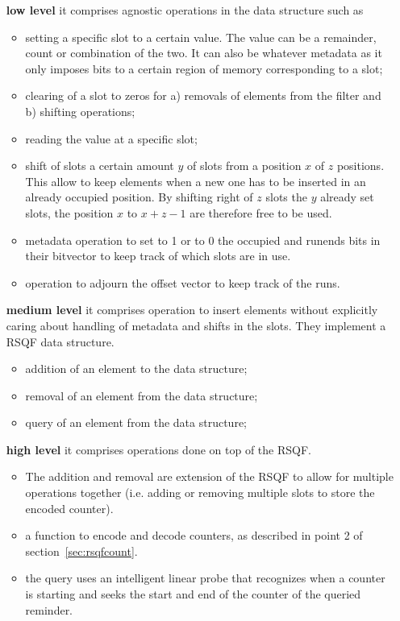 \begin{itemize}
	\item[\textbf{low level}] it comprises agnostic operations in the data structure such as
	\begin{itemize}
		\item setting a specific slot to a certain value. The value can be a remainder, count or combination of the two. It can also be whatever metadata as it only imposes bits to a certain region of memory corresponding to a slot;
		\item clearing of a slot to zeros for a) removals of elements from the filter and b) shifting operations;
		\item reading the value at a specific slot;
		\item shift of slots a certain amount $y$ of slots from a position $x$ of $z$ positions. This allow to keep elements when a new one has to be inserted in an already occupied position. By shifting right of $z$ slots the $y$ already set slots, the position $x$ to $x+z-1$ are therefore free to be used.
		\item metadata operation to set to 1 or to 0 the occupied and runends bits in their bitvector to keep track of which slots are in use.
		\item operation to adjourn the offset vector to keep track of the runs.
	\end{itemize}
	\item[\textbf{medium level}] it comprises operation to insert elements without explicitly caring about handling of metadata and shifts in the slots. They implement a RSQF data structure.
	\begin{itemize}
		\item addition of an element to the data structure;
		\item removal of an element from the data structure;
		\item query of an element from the data structure;
	\end{itemize}
	\item[\textbf{high level}] it comprises operations done on top of the RSQF. 
	\begin{itemize}
		\item The addition and removal are extension of the RSQF to allow for multiple operations together (i.e. adding or removing multiple slots to store the encoded counter).
		\item a function to encode and decode counters, as described in point 2 of section~\ref{sec:rsqfcount}.
		\item the query uses an intelligent linear probe that recognizes when a counter is starting and seeks the start and end of the counter of the queried reminder.

\end{itemize}
\end{itemize}
